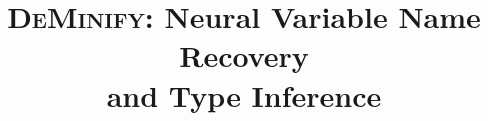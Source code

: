 \documentclass[sigconf,review,anonymous]{acmart}
\newcommand{\tool}{\textsc{DeMinify}\xspace}
\begin{document}


\title[{\tool}: Neural Variable Name Recovery and Type Inference]
{{\tool}: Neural Variable Name Recovery\\ and Type Inference}








\renewcommand\footnotetextcopyrightpermission[1]{} %





\end{document}
